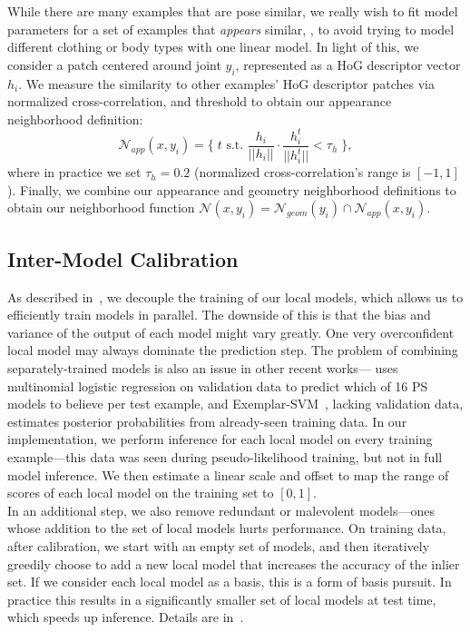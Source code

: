   While there are 
many examples that are pose similar, we really wish to fit model parameters for 
a set of examples that {\em appears} similar, \eg, to avoid trying to model
different clothing or body types with one linear model.  In light of this, we 
consider a patch centered around joint $y_i$, represented as a HoG descriptor 
vector $h_i$.  We measure the similarity to other examples' HoG descriptor 
patches via normalized cross-correlation, and threshold to obtain our 
appearance neighborhood definition: $$  \mathcal{N}_{app}(x,y_i) = \{\; t 
\text{ s.t. } \frac{h_i}{||h_i||} \cdot \frac{h_i^t}{||h_i^t||} < \tau_h 
\;\},$$ where in practice we set $\tau_h = 0.2$ (normalized cross-correlation's 
range is $[-1,1]$).
Finally, we combine our appearance and geometry neighborhood definitions to 
obtain our neighborhood function $\mathcal{N}(x,y_i) = \mathcal{N}_{geom}(y_i) 
\cap \mathcal{N}_{app}(x,y_i).$

\subsection{Inter-Model Calibration}\label{sec:calib}  As described 
in~, we decouple the training of our local models, which 
allows us to efficiently train models in parallel.  The downside of this is 
that the bias and variance of the output of each model might vary greatly.  One 
very overconfident local model may always dominate the prediction step.  The 
problem of combining separately-trained models is also an issue in other recent 
works---\citet{johnson11} uses multinomial logistic regression on validation 
data to predict which of 16 PS models to believe per test example, and
Exemplar-SVM~\citep{esvm}, lacking validation data, estimates posterior 
probabilities from already-seen training data. In our implementation, we 
perform inference for each local model on every training example---this data 
was seen during pseudo-likelihood training, but not in full model inference.  
We then estimate a linear scale and offset to map the range of scores of each 
local model on the training set to $[0,1]$.  \\
 In an additional step, we also remove redundant or 
malevolent models---ones whose addition to the set of local models hurts 
performance.  On training data, after calibration, we start with an empty set 
of models, and then iteratively greedily choose to add a new local model that 
increases the accuracy of the inlier set.  If we consider each local model as a 
basis, this is a form of basis pursuit.  In practice this results in a 
significantly smaller set of local models at test time, which speeds up 
inference. Details are in~.  

